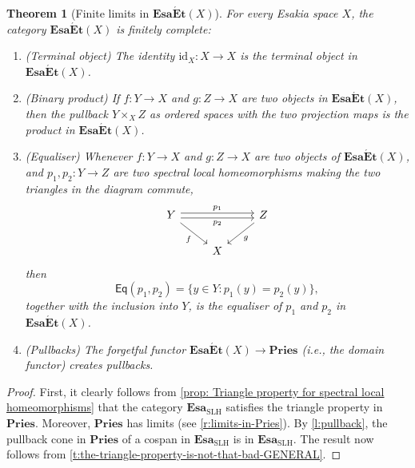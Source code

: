 \documentclass[12pt]{amsart}
\theoremstyle{plain}
\newtheorem{theorem}{Theorem}[section]
\theoremstyle{definition}
\newcommand{\cat}[1]{\mathbf{#1}}
\newcommand{\id}{\mathrm{id}}
\newcommand{\Esa}{\cat{Esa}}
\newcommand{\Pries}{\cat{Pries}}
\newcommand{\SLH}{\mathrm{SLH}}
\newcommand{\EsaEt}{\cat{Esa\acute{E}t}}
\begin{document}
\begin{theorem}[Finite limits in $\EsaEt(X)$] \label{t:the-triangle-property-is-not-that-bad}
    For every Esakia space $X$, the category $\EsaEt(X)$ is finitely complete:
    \begin{enumerate}
    
        \item \label{eq: terminal object} 
        \emph{(Terminal object)} 
        The identity $\id_{X} \colon X \to X$ is the terminal object in $\EsaEt(X)$.
        
        \item \label{eq: binary product} 
        \emph{(Binary product)} 
        If $f \colon Y\to X$ and $g \colon Z\to X$ are two objects in $\EsaEt(X)$, then the pullback $Y\times_{X}Z$ as ordered spaces with the two projection maps is the product in $\EsaEt(X)$.
        
        \item \label{eq: equaliser} 
        \emph{(Equaliser)} 
        Whenever $f \colon Y\to X$ and $g \colon Z\to X$ are two objects of $\EsaEt(X)$, and $p_{1},p_{2} \colon Y\to Z$ are two spectral local homeomorphisms making the two triangles in the diagram commute,
        \[
            \begin{tikzcd}
                Y \arrow[rr, shift left=.5ex, "p_{1}"] \arrow[rr, shift right=.5ex, swap, "p_{2}"] \arrow[dr, swap, "f"] && Z \arrow[dl, "g"] \\
                & X
            \end{tikzcd}
        \]
        then
        \[
            \mathsf{Eq}(p_{1},p_{2})=\{y\in Y : p_{1}(y)=p_{2}(y)\},
        \]
        together with the inclusion into $Y$, is the equaliser of $p_{1}$ and $p_{2}$ in $\EsaEt(X)$.   

        \item \label{i:pullbacks}
        \emph{(Pullbacks)} The  forgetful functor $\EsaEt(X) \to \Pries$ (i.e., the domain functor) creates pullbacks.
    \end{enumerate}
\end{theorem}

\begin{proof}
    First, it clearly follows from \cref{prop: Triangle property for spectral local homeomorphisms} that the category $\Esa_{\SLH}$ satisfies the triangle property in $\Pries$.  Moreover, $\Pries$ has limits (see \cref{r:limits-in-Pries}). By \cref{l:pullback}, the pullback cone in $\Pries$ of a cospan in $\Esa_{\SLH}$ is in $\Esa_{\SLH}$.
    The result now follows from \cref{t:the-triangle-property-is-not-that-bad-GENERAL}.
\end{proof}
\end{document}
